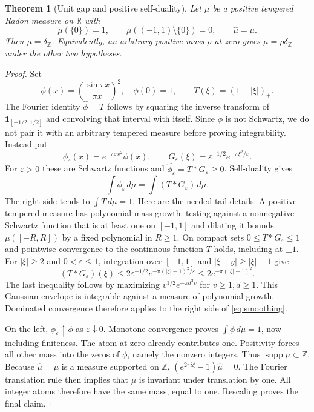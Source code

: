\documentclass[11pt]{article}
\newtheorem{theorem}{Theorem}
\theoremstyle{remark}\newtheorem{remark}[theorem]{Remark}
\newcommand{\Z}{\mathbb Z}\newcommand{\N}{\mathbb N}
\newcommand{\R}{\mathbb R}\newcommand{\C}{\mathbb C}
\newcommand{\dd}{\,d}\newcommand{\comb}[1]{\delta_{#1}}
\begin{document}
\begin{theorem}[Unit gap and positive self-duality]\label{thm:gap}
Let $\mu$ be a positive tempered Radon measure on $\R$ with
\[
 \mu(\{0\})=1,\qquad \mu((-1,1)\setminus\{0\})=0,
 \qquad \widehat\mu=\mu.
\]
Then $\mu=\comb{\Z}$. Equivalently, an arbitrary positive mass $\rho$
at zero gives $\mu=\rho\comb{\Z}$ under the other two hypotheses.
\end{theorem}
\begin{proof}
Set
\[
 \phi(x)=\left(\frac{\sin\pi x}{\pi x}\right)^2,\quad \phi(0)=1,
 \qquad T(\xi)=(1-|\xi|)_+.
\]
The Fourier identity $\widehat\phi=T$ follows by squaring the inverse
transform of $\mathbf1_{[-1/2,1/2]}$ and convolving that interval with
itself. Since $\phi$ is not Schwartz, we do not pair it with an arbitrary
tempered measure before proving integrability. Instead put
\[
 \phi_\varepsilon(x)=e^{-\pi\varepsilon x^2}\phi(x),\qquad
 G_\varepsilon(\xi)=\varepsilon^{-1/2}e^{-\pi\xi^2/\varepsilon}.
\]
For $\varepsilon>0$ these are Schwartz functions and
$\widehat{\phi_\varepsilon}=T*G_\varepsilon\geq0$. Self-duality gives
\begin{equation}\label{eq:smoothing}
 \int\phi_\varepsilon\dd\mu
   =\int(T*G_\varepsilon)\dd\mu.
\end{equation}
The right side tends to $\int T\dd\mu=1$. Here are the needed tail
details. A positive tempered measure has polynomial mass growth: testing
against a nonnegative Schwartz function that is at least one on $[-1,1]$
and dilating it bounds $\mu([-R,R])$ by a fixed polynomial in $R\geq1$.
On compact sets $0\leq T*G_\varepsilon\leq1$ and pointwise convergence
to the continuous function $T$ holds, including at $\pm1$. For
$|\xi|\geq2$ and $0<\varepsilon\leq1$, integration over $[-1,1]$
and $|\xi-y|\geq|\xi|-1$ give
\[
 (T*G_\varepsilon)(\xi)
 \leq 2\varepsilon^{-1/2}
        e^{-\pi(|\xi|-1)^2/\varepsilon}
 \leq2e^{-\pi(|\xi|-1)^2}.
\]
The last inequality follows by maximizing
$v^{1/2}e^{-\pi d^2v}$ for $v\geq1,d\geq1$. This Gaussian envelope
is integrable against a measure of polynomial growth. Dominated convergence
therefore applies to the right side of \eqref{eq:smoothing}.

On the left, $\phi_\varepsilon\uparrow\phi$ as
$\varepsilon\downarrow0$. Monotone convergence proves
$\int\phi\dd\mu=1$, now including finiteness. The atom at zero
already contributes one. Positivity forces all other mass into the zeros of
$\phi$, namely the nonzero integers. Thus $\operatorname{supp}\mu\subset\Z$.
Because $\widehat\mu=\mu$ is a measure supported on $\Z$,
$(e^{2\pi i\xi}-1)\widehat\mu=0$. The Fourier translation rule then
implies that $\mu$ is invariant under translation by one. All integer atoms
therefore have the same mass, equal to one. Rescaling proves the final claim.
\end{proof}
\end{document}
